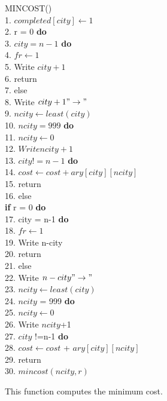 \documentclass{article}
\begin{document}
     \begin{figure}
\begin{center}
\begin{tabbing}
{MINCOST()} \\
1. $completed[city] \leftarrow 1$\\
2.  r = 0 
{\bf do}\\
3.   $city = n-1$ {\bf do}\\
4.      \indent     $ fr \leftarrow 1$ \\
5.      \indent      Write $city+1$ \\
6.       \indent   return \\
7.  \indent else \\
8.      \indent Write $city+1 "\rightarrow"$ \\
9.      \indent $ncity \leftarrow least(city)$\\
10.   $ncity = 999$ {\bf do}\\
11.   \indent      $ncity \leftarrow 0 $\\
12.  \indent $Write ncity+1$  \\
13.   $city !=n-1$ {\bf do}\\
14.   \indent $cost \leftarrow cost + ary[city][ncity]$ \\
15. \indent return\\
16. \indent else \\
{\bf if} r = 0 {\bf do}\\
17.   city = n-1 {\bf do}\\
18.   \indent   $   fr \leftarrow 1$ \\
19.   \indent      Write n-city \\
20. return \\
21. \indent else \\
22. \indent Write $n-city "\rightarrow"$ \\
23. \indent$ ncity \leftarrow least(city)$\\
24.   $ncity$ = 999 {\bf do}\\
25.   \indent    $ncity \leftarrow 0$ \\
26.  \indent Write $ncity$+1  \\
27.   $city$ !=n-1 {\bf do}\\
28.   \indent $cost \leftarrow cost$ + $ary[city][ncity]$ \\
29. \indent return\\
30.  \indent $mincost(ncity, r)$ \\

\end{tabbing}
\caption{This function computes the minimum cost.}
\label{fig_alg_ex3}

\end{center}
\end{figure}
\end{document}
